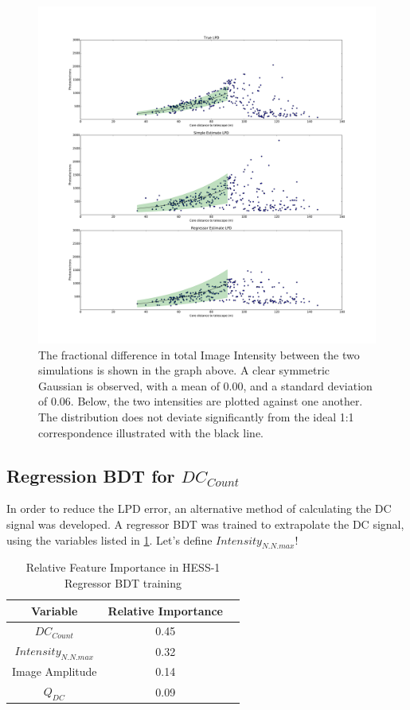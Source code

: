 \documentclass{article}
\begin{document}
\begin{figure}
\begin{center}
\includegraphics[width=\textwidth]{corsikalpd1}
\caption{The fractional difference in total Image Intensity between the two simulations is shown in the graph above. A clear symmetric Gaussian is observed, with a mean of 0.00, and a standard deviation of 0.06. Below, the two intensities are plotted against one another. The distribution does not deviate significantly from the ideal 1:1 correspondence illustrated with the black line.}
\label{fig:corsikalpd}
\end{center}
\end{figure}

\subsection{Regression BDT for $DC_{Count}$}
In order to reduce the LPD error, an alternative method of calculating the DC signal was developed. A regressor BDT was trained to extrapolate the DC signal, using the variables listed in \ref{tab:hess1regressor}. Let's define $Intensity_{N.N.max}$!

\begin{table}[h!]
  \centering
  \caption{Relative Feature Importance in HESS-1 Regressor BDT training}
  \label{tab:hess1regressor}
  \begin{tabular}{ccc}
    \toprule
    Variable & Relative Importance\\
    \midrule
    $DC_{Count}$ & 0.45\\
    $Intensity_{N.N.max}$ & 0.32\\
    Image Amplitude & 0.14\\
    $Q_{DC}$ & 0.09\\
    \bottomrule
  \end{tabular}
\end{table} 
\end{document}

